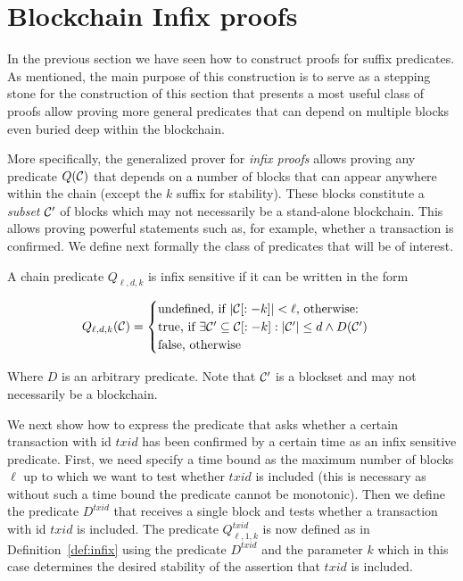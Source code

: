 \section{Blockchain Infix proofs}

\label{sec:infix}


In the previous section we have seen how to construct proofs for suffix predicates.
As mentioned, the main purpose of this construction is to serve as a stepping
stone for the construction of this section that presents
a most useful class of
proofs allow proving more general predicates that can depend on multiple blocks
even buried deep within the blockchain.

More specifically, the generalized prover for
\textit{infix proofs} allows proving any predicate $Q(\mathcal{C})$ that depends on a
number of blocks that can appear anywhere within the chain (except the $k$
suffix for stability). These blocks constitute a \textit{subset} $\mathcal{C}'$ of
blocks which may not necessarily be a stand-alone blockchain. This allows
proving powerful statements such as, for example, whether a transaction is
confirmed.
We define next formally the class of predicates that will be of interest.

\begin{definition}
\label{def:infix}
A chain predicate $Q_{\ell,d,k}$ is \textnormal{infix sensitive} if it can be
written in the form

$$
Q_{\ell,d,k}(\mathcal{C}) =
\begin{cases}
  \text{undefined, if } |\mathcal{C}[:-k]| < \ell \text{, otherwise:}\\
  \text{true, if }
    \exists \mathcal{C}' \subseteq \mathcal{C}[:-k]: |\mathcal{C}'| \leq d \land D(\mathcal{C}')\\
  \text{false, otherwise}
\end{cases}
$$

Where $D$ is an arbitrary predicate. Note that $\mathcal{C}'$ is a blockset and may
not necessarily be a blockchain.
\end{definition}

We next show how to express the predicate that asks whether
a certain transaction with id $txid$ has been confirmed by a certain time as an infix sensitive predicate.
First, we need specify a time bound  as the maximum number of blocks
$\ell$ up to which we want to test whether $txid$ is included (this is necessary as without such a time bound the predicate cannot be monotonic). Then we define the
 predicate $D^{txid}$ that receives  a single block and tests whether a transaction with id $txid$ is included. The predicate $Q^{txid}_{\ell, 1, k}$  is now defined
as in Definition~\ref{def:infix}  using the predicate $D^{txid}$ and the parameter $k$ which in this case  determines the desired stability of the assertion that $txid$ is included.


